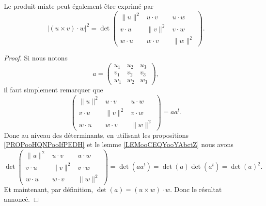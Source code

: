 \begin{lemma}        \label{LEMooSMWNooCmEZeY}
    Le produit mixte peut également être exprimé par
    \begin{equation}        \label{EQooWZUQooYydphW}
           |(u\times v)\cdot w|^2=\det\begin{pmatrix}
            \| u \|^2    &   u\cdot v    &   u\cdot w    \\
            v\cdot u    &   \| v \|^2    &   v\cdot w    \\
            w\cdot u    &   w\cdot v    &   \| w \|^2
        \end{pmatrix}.
    \end{equation}
\end{lemma}

\begin{proof}
    Si nous notons 
    \begin{equation}
        a= \begin{pmatrix}
                u_1	&	u_2	&	u_3	\\
                v_1	&	v_2	&	v_3	\\
                w_1	&	w_2	&	w_3
        \end{pmatrix},
    \end{equation}
    il faut simplement remarquer que
    \begin{equation}
           \begin{pmatrix}
            \| u \|^2    &   u\cdot v    &   u\cdot w    \\
            v\cdot u    &   \| v \|^2    &   v\cdot w    \\
            w\cdot u    &   w\cdot v    &   \| w \|^2
        \end{pmatrix}=aa^t.
    \end{equation}
    Donc au niveau des déterminants, en utilisant les propositions \ref{PROPooHQNPooIfPEDH} et le lemme \ref{LEMooCEQYooYAbctZ} nous avons
    \begin{equation}
           \det\begin{pmatrix}
            \| u \|^2    &   u\cdot v    &   u\cdot w    \\
            v\cdot u    &   \| v \|^2    &   v\cdot w    \\
            w\cdot u    &   w\cdot v    &   \| w \|^2
        \end{pmatrix}=\det(aa^t)=\det(a)\det(a^t)=\det(a)^2.
    \end{equation}
    Et maintenant, par définition, \( \det(a)=(u\times w)\cdot w\). Donc le résultat annoncé.
\end{proof}

